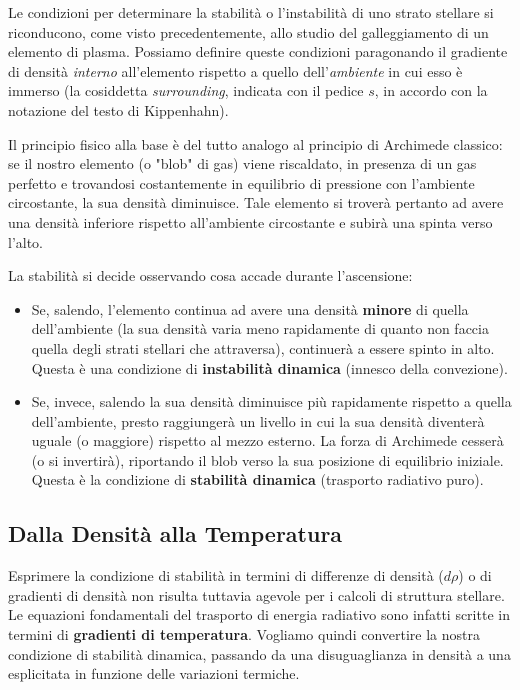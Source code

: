 Le condizioni per determinare la stabilità o l'instabilità di uno strato stellare si riconducono, come visto precedentemente, allo studio del galleggiamento di un elemento di plasma. Possiamo definire queste condizioni paragonando il gradiente di densità \textit{interno} all'elemento rispetto a quello dell'\textit{ambiente} in cui esso è immerso (la cosiddetta \textit{surrounding}, indicata con il pedice $s$, in accordo con la notazione del testo di Kippenhahn).

Il principio fisico alla base è del tutto analogo al principio di Archimede classico: se il nostro elemento (o "blob" di gas) viene riscaldato, in presenza di un gas perfetto e trovandosi costantemente in equilibrio di pressione con l'ambiente circostante, la sua densità diminuisce. Tale elemento si troverà pertanto ad avere una densità inferiore rispetto all'ambiente circostante e subirà una spinta verso l'alto.

La stabilità si decide osservando cosa accade durante l'ascensione:
\begin{itemize}
\item Se, salendo, l'elemento continua ad avere una densità \textbf{minore} di quella dell'ambiente (la sua densità varia meno rapidamente di quanto non faccia quella degli strati stellari che attraversa), continuerà a essere spinto in alto. Questa è una condizione di \textbf{instabilità dinamica} (innesco della convezione).
\item Se, invece, salendo la sua densità diminuisce più rapidamente rispetto a quella dell'ambiente, presto raggiungerà un livello in cui la sua densità diventerà uguale (o maggiore) rispetto al mezzo esterno. La forza di Archimede cesserà (o si invertirà), riportando il blob verso la sua posizione di equilibrio iniziale. Questa è la condizione di \textbf{stabilità dinamica} (trasporto radiativo puro).
\end{itemize}

\subsection{Dalla Densità alla Temperatura}

Esprimere la condizione di stabilità in termini di differenze di densità ($d\rho$) o di gradienti di densità non risulta tuttavia agevole per i calcoli di struttura stellare. Le equazioni fondamentali del trasporto di energia radiativo sono infatti scritte in termini di \textbf{gradienti di temperatura}. Vogliamo quindi convertire la nostra condizione di stabilità dinamica, passando da una disuguaglianza in densità a una esplicitata in funzione delle variazioni termiche.

